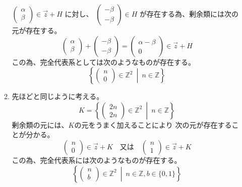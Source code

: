 \documentclass[12pt,b5paper]{ltjsarticle}
\begin{document}
\begin{enumerate}
\begin{enumerate}
            $\begin{pmatrix}\alpha\\\beta\end{pmatrix}\in\vec{z}+H$
            に対し、%
            $\begin{pmatrix}-\beta\\-\beta\end{pmatrix}\in H$
            が存在する為、剰余類には次の元が存在する。
            \[
             \begin{pmatrix}\alpha\\\beta\end{pmatrix}
             + \begin{pmatrix}-\beta\\-\beta\end{pmatrix}
             = \begin{pmatrix}\alpha-\beta\\0\end{pmatrix}
             \in\vec{z}+H
            \]
            この為、完全代表系としては次のようなものが存在する。
            \[
             \left\{ \begin{pmatrix}n\\0\end{pmatrix}\in\mathbb{Z}^2
            \ \middle|\ n\in\mathbb{Z}\right\}
            \]
       \item
            先ほどと同じように考える。
            \[
             K=\left\{
            \begin{pmatrix}2n\\2n\end{pmatrix}
            \in\mathbb{Z}^2
            \ \middle| \
            n\in\mathbb{Z}
            \right\}
            \]
            剰余類の元には、$K$の元をうまく加えることにより
            次の元が存在することが分かる。
            \[
              \begin{pmatrix}n\\0\end{pmatrix}\in\vec{z}+K
              \quad 又は \quad
              \begin{pmatrix}n\\1\end{pmatrix}\in\vec{z}+K
            \]
            この為、完全代表系には次のようなものが存在する。
            \[
             \left\{ \begin{pmatrix}n\\b\end{pmatrix}\in\mathbb{Z}^2
            \ \middle|\ n\in\mathbb{Z} , b\in\{0,1\} \right\}
\]
\end{enumerate}
\end{enumerate}
\end{document}
